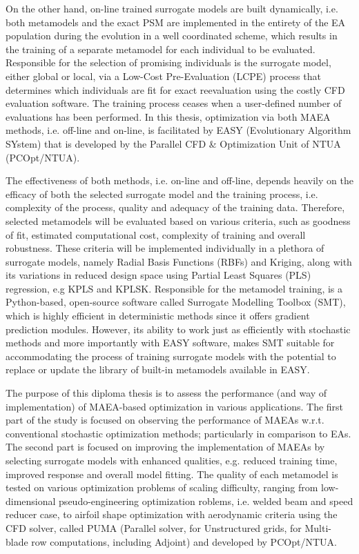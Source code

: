 On the other hand, on-line trained surrogate models are built 
dynamically, i.e. both metamodels and the exact PSM are implemented 
in the entirety of the EA population during the evolution in a well 
coordinated scheme, which results in the training of a separate 
metamodel for each individual to be evaluated. Responsible for the 
selection of promising individuals is the surrogate model, either 
global or local, via a Low-Cost Pre-Evaluation (LCPE)
\cite{LCPE} process that determines which 
individuals are fit for exact reevaluation using the costly 
CFD evaluation software. The training process ceases when a 
user-defined number of evaluations has been performed. In this 
thesis, optimization via both MAEA methods, i.e. off-line and 
on-line, is facilitated by  EASY (Evolutionary Algorithm 
SYstem)\cite{EASY} that is developed by the Parallel CFD \& 
Optimization Unit of NTUA (PCOpt/NTUA). 

The effectiveness of both methods, i.e. on-line and off-line, 
depends heavily on the efficacy of both the selected surrogate 
model and the training process, i.e. complexity of the process, 
quality and adequacy of the training data. Therefore, selected 
metamodels will be evaluated based on various criteria, such 
as goodness of fit, estimated computational cost, complexity 
of training and overall robustness. These criteria will 
be implemented individually in a plethora of surrogate 
models, namely Radial Basis Functions (RBFs) \cite{RBF, 
RBF1, RBF2} and Kriging\cite{Kriging,Kriging1}, 
along with its variations in reduced design space using Partial 
Least Squares (PLS) regression, e.g KPLS\cite{KPLS} and 
KPLSK\cite{KPLSK}. Responsible for the metamodel training, is 
a Python-based, open-source software called Surrogate Modelling 
Toolbox (SMT)\cite{preprint_SMT}, which is highly efficient in 
deterministic methods since it offers gradient prediction 
modules. However, its ability to work just as efficiently 
with stochastic methods and more importantly with EASY 
software, makes SMT suitable for accommodating the process 
of training surrogate models with the potential to replace or 
update the library of built-in metamodels available in EASY.

The purpose of this diploma thesis is to assess the performance 
(and way of implementation) of MAEA-based optimization in various 
applications. The first part of the study is focused on 
observing the performance of MAEAs w.r.t. conventional 
stochastic optimization methods; particularly in comparison 
to EAs. The second part is focused on improving the 
implementation of MAEAs by selecting surrogate models with 
enhanced qualities, e.g. reduced training time, improved 
response and overall model fitting. The quality of each 
metamodel is tested on various optimization problems of 
scaling difficulty, ranging from low-dimensional 
pseudo-engineering optimization roblems, i.e. welded beam and speed 
reducer case, to airfoil shape optimization with aerodynamic 
criteria using the CFD solver, called PUMA (Parallel solver, 
for Unstructured grids, for Multi-blade row computations, including 
Adjoint) and developed by PCOpt/NTUA.

